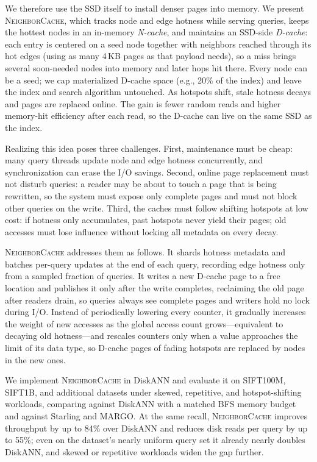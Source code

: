 We therefore use the SSD itself to install denser pages into memory.
We present \textsc{NeighborCache}, which tracks node and edge hotness while serving queries, keeps the hottest nodes in an in-memory \emph{N-cache}, and maintains an SSD-side \emph{D-cache}: each entry is centered on a seed node together with neighbors reached through its hot edges (using as many 4\,KB pages as that payload needs), so a miss brings several soon-needed nodes into memory and later hops hit there.
Every node can be a seed; we cap materialized D-cache space (e.g., 20\% of the index) and leave the index and search algorithm untouched.
As hotspots shift, stale hotness decays and pages are replaced online.
The gain is fewer random reads and higher memory-hit efficiency after each read, so the D-cache can live on the same SSD as the index.

Realizing this idea poses three challenges.
First, maintenance must be cheap: many query threads update node and edge hotness concurrently, and synchronization can erase the I/O savings.
Second, online page replacement must not disturb queries: a reader may be about to touch a page that is being rewritten, so the system must expose only complete pages and must not block other queries on the write.
Third, the caches must follow shifting hotspots at low cost: if hotness only accumulates, past hotspots never yield their pages; old accesses must lose influence without locking all metadata on every decay.

\textsc{NeighborCache} addresses them as follows.
It shards hotness metadata and batches per-query updates at the end of each query, recording edge hotness only from a sampled fraction of queries.
It writes a new D-cache page to a free location and publishes it only after the write completes, reclaiming the old page after readers drain, so queries always see complete pages and writers hold no lock during I/O.
Instead of periodically lowering every counter, it gradually increases the weight of new accesses as the global access count grows---equivalent to decaying old hotness---and rescales counters only when a value approaches the limit of its data type, so D-cache pages of fading hotspots are replaced by nodes in the new ones.

We implement \textsc{NeighborCache} in DiskANN and evaluate it on SIFT100M, SIFT1B, and additional datasets under skewed, repetitive, and hotspot-shifting workloads, comparing against DiskANN with a matched BFS memory budget and against Starling and MARGO.
At the same recall, \textsc{NeighborCache} improves throughput by up to 84\% over DiskANN and reduces disk reads per query by up to 55\%; even on the dataset's nearly uniform query set it already nearly doubles DiskANN, and skewed or repetitive workloads widen the gap further.

